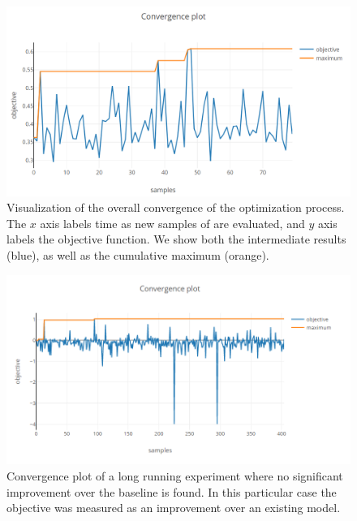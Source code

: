 \begin{figure}
	\begin{center}
		\includegraphics[width=1.0\textwidth]{images/convergence-plot.png}
		\caption{Visualization of the overall convergence of the optimization process. The $x$ axis labels time as new samples of are evaluated, and $y$ axis labels the objective function. We show both the intermediate results (blue), as well as the cumulative maximum (orange).}
		\label{figure:convergence-plot}
	\end{center}
\end{figure}

\begin{figure}
	\begin{center}
		\includegraphics[width=1.0\textwidth]{images/convergence-plot-long-exp.png}
		\caption{Convergence plot of a long running experiment where no significant improvement over the baseline is found. In this particular case the objective was measured as an improvement over an existing model.}
		\label{figure:convergence-plot-long-exp}
	\end{center}
\end{figure}


